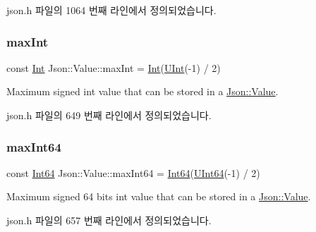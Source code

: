 json.\+h 파일의 1064 번째 라인에서 정의되었습니다.

\mbox{\label{class_json_1_1_value_a978c799a8af3114ef7dab6fd0a310a1b}} 
\subsubsection{\texorpdfstring{max\+Int}{maxInt}}
{\footnotesize\ttfamily const \hyperlink{class_json_1_1_value_abdf7a7ff73eb130ffcab28504ffdb405}{Int} Json\+::\+Value\+::max\+Int = \hyperlink{class_json_1_1_value_abdf7a7ff73eb130ffcab28504ffdb405}{Int}(\hyperlink{class_json_1_1_value_a0933d59b45793ae4aade1757c322a98d}{U\+Int}(-\/1) / 2)\hspace{0.3cm}{\ttfamily [static]}}



Maximum signed int value that can be stored in a \hyperlink{class_json_1_1_value}{Json\+::\+Value}. 



json.\+h 파일의 649 번째 라인에서 정의되었습니다.

\mbox{\label{class_json_1_1_value_a4492634870b8c5709ce967b384ac6006}} 
\subsubsection{\texorpdfstring{max\+Int64}{maxInt64}}
{\footnotesize\ttfamily const \hyperlink{class_json_1_1_value_a1b86af9f85f0f1baa972c3319fa22695}{Int64} Json\+::\+Value\+::max\+Int64 = \hyperlink{class_json_1_1_value_a1b86af9f85f0f1baa972c3319fa22695}{Int64}(\hyperlink{class_json_1_1_value_a8b62564be8c087c6d18de180ff4e13e3}{U\+Int64}(-\/1) / 2)\hspace{0.3cm}{\ttfamily [static]}}



Maximum signed 64 bits int value that can be stored in a \hyperlink{class_json_1_1_value}{Json\+::\+Value}. 



json.\+h 파일의 657 번째 라인에서 정의되었습니다.

\mbox{\label{class_json_1_1_value_a8b4977696f13296fa8755c7953fafb2f}} 
